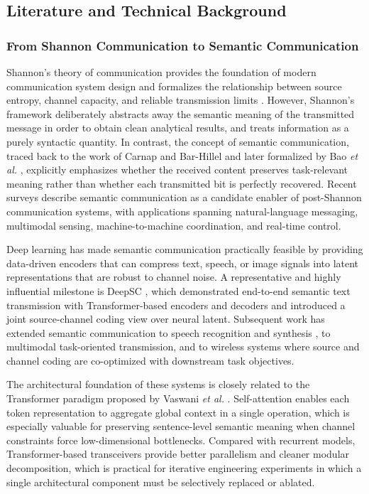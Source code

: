 \subsection{Literature and Technical Background}

\subsubsection{From Shannon Communication to Semantic Communication}

Shannon's theory of communication provides the foundation of modern communication system design and formalizes the relationship between source entropy, channel capacity, and reliable transmission limits \cite{shannon1948, shannon1948part2}. However, Shannon's framework deliberately abstracts away the semantic meaning of the transmitted message in order to obtain clean analytical results, and treats information as a purely syntactic quantity. In contrast, the concept of semantic communication, traced back to the work of Carnap and Bar-Hillel \cite{carnap1954} and later formalized by Bao \emph{et al.} \cite{bao2011semantic}, explicitly emphasizes whether the received content preserves task-relevant meaning rather than whether each transmitted bit is perfectly recovered. Recent surveys \cite{lu2024survey, getu2024tutorial} describe semantic communication as a candidate enabler of post-Shannon communication systems, with applications spanning natural-language messaging, multimodal sensing, machine-to-machine coordination, and real-time control.

Deep learning has made semantic communication practically feasible by providing data-driven encoders that can compress text, speech, or image signals into latent representations that are robust to channel noise. A representative and highly influential milestone is DeepSC \cite{xie2021deepsc}, which demonstrated end-to-end semantic text transmission with Transformer-based encoders and decoders and introduced a joint source-channel coding view over neural latent. Subsequent work has extended semantic communication to speech recognition and synthesis \cite{shi2023speech}, to multimodal task-oriented transmission, and to wireless systems where source and channel coding are co-optimized with downstream task objectives.

The architectural foundation of these systems is closely related to the Transformer paradigm proposed by Vaswani \emph{et al.} \cite{vaswani2017attention}. Self-attention enables each token representation to aggregate global context in a single operation, which is especially valuable for preserving sentence-level semantic meaning when channel constraints force low-dimensional bottlenecks. Compared with recurrent models, Transformer-based transceivers provide better parallelism and cleaner modular decomposition, which is practical for iterative engineering experiments in which a single architectural component must be selectively replaced or ablated.

